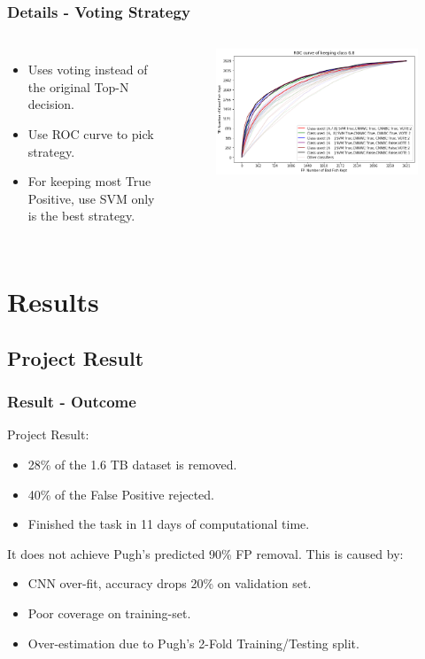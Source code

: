 \documentclass{beamer}[fullspacing]
\begin{document}
\begin{frame}
\frametitle{Details - Voting Strategy}

\begin{columns}
\begin{itemize}
\item
Uses voting instead of the original Top-N decision.
\item
Use ROC curve to pick strategy.
\item
For keeping most True Positive, use SVM only is the best strategy.
\end{itemize}

\begin{figure}
\includegraphics[scale=0.2]{image/roccurve.png}
\end{figure}
\end{columns}
\end{frame}



\section{Results}
\subsection{Project Result}
\begin{frame}
\frametitle{Result - Outcome}

Project Result:
\begin{itemize}
\item
28\% of the 1.6 TB dataset is removed.
\item
40\% of the False Positive rejected.
\item
Finished the task in 11 days of computational time.
\end{itemize}

It does not achieve Pugh's predicted 90\% FP removal.
This is caused by:
\begin{itemize}
\item
CNN over-fit, accuracy drops 20\% on validation set.
\item
Poor coverage on training-set.
\item
Over-estimation due to Pugh's 2-Fold Training/Testing split.
\end{itemize}
\end{frame}
\end{document}
